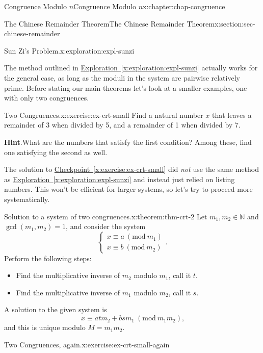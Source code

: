 \documentclass[oneside,10pt,]{book}
\newcommand{\blocktitlefont}{\relax}
\newcommand{\xreffont}{\relax}
\numberwithin{equation}{section}
\newcommand{\Mod}[1]{\ \left(\mathrm{mod}\ #1\right)}
\begin{document}
\begin{chapterptx}{Congruence Modulo \(n\)}{}{Congruence Modulo \(n\)}{}{}{x:chapter:chap-congruence}
\begin{sectionptx}{The Chinese Remainder Theorem}{}{The Chinese Remainder Theorem}{}{}{x:section:sec-chinese-remainder}
\begin{exploration}{Sun Zi's Problem.}{x:exploration:expl-sunzi}
\end{exploration}
The method outlined in \hyperref[x:exploration:expl-sunzi]{Exploration~{\xreffont\ref{x:exploration:expl-sunzi}}} actually works for the general case, as long as the moduli in the system are pairwise relatively prime. Before stating our main theorems let's look at a smaller examples, one with only two congruences.%
\begin{inlineexercise}{Two Congruences.}{x:exercise:ex-crt-small}%
Find a natural number \(x\) that leaves a remainder of 3 when divided by 5, and a remainder of 1 when divided by 7.%
\par\smallskip%
\noindent\textbf{\blocktitlefont Hint}.\hypertarget{g:hint:id454513}{}\quad{}What are the numbers that satisfy the first condition? Among these, find one satisfying the second as well.%
\end{inlineexercise}
The solution to \hyperref[x:exercise:ex-crt-small]{Checkpoint~{\xreffont\ref{x:exercise:ex-crt-small}}} did \emph{not} use the same method as \hyperref[x:exploration:expl-sunzi]{Exploration~{\xreffont\ref{x:exploration:expl-sunzi}}} and instead just relied on listing numbers. This won't be efficient for larger systems, so let's try to proceed more systematically.%
\begin{theorem}{Solution to a system of two congruences.}{}{x:theorem:thm-crt-2}%
Let \(m_1,m_2 \in \mathbb{N}\) and \(\gcd(m_1,m_2) = 1\), and consider the system%
\begin{equation*}
\begin{cases} x \equiv a \Mod{m_1} \\ x \equiv b \Mod{m_2} \end{cases}\text{.}
\end{equation*}
Perform the following steps:%
\begin{itemize}[label=\textbullet]
\item{}Find the multiplicative inverse of \(m_2\) modulo \(m_1\), call it \(t\).%
\item{}Find the multiplicative inverse of \(m_1\) modulo \(m_2\), call it \(s\).%
\end{itemize}
A solution to the given system is%
\begin{equation*}
x \equiv atm_2 + bsm_1 \Mod{m_1m_2}\text{,}
\end{equation*}
and this is unique modulo \(M = m_1m_2\).%
\end{theorem}
\begin{inlineexercise}{Two Congruences, again.}{x:exercise:ex-crt-small-again}%

\end{inlineexercise}
\end{sectionptx}
\end{chapterptx}
\end{document}
